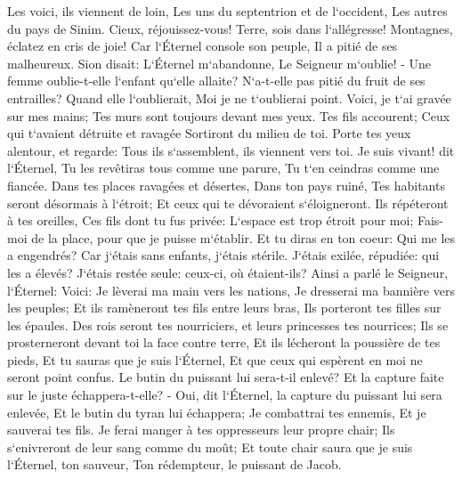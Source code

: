 \verse Les voici, ils viennent de loin, Les uns du septentrion et de l`occident, Les autres du pays de Sinim. 
\verse Cieux, réjouissez-vous! Terre, sois dans l`allégresse! Montagnes, éclatez en cris de joie! Car l`Éternel console son peuple, Il a pitié de ses malheureux. 
\verse Sion disait: L`Éternel m`abandonne, Le Seigneur m`oublie! - 
\verse Une femme oublie-t-elle l`enfant qu`elle allaite? N`a-t-elle pas pitié du fruit de ses entrailles? Quand elle l`oublierait, Moi je ne t`oublierai point. 
\verse Voici, je t`ai gravée sur mes mains; Tes murs sont toujours devant mes yeux. 
\verse Tes fils accourent; Ceux qui t`avaient détruite et ravagée Sortiront du milieu de toi. 
\verse Porte tes yeux alentour, et regarde: Tous ils s`assemblent, ils viennent vers toi. Je suis vivant! dit l`Éternel, Tu les revêtiras tous comme une parure, Tu t`en ceindras comme une fiancée. 
\verse Dans tes places ravagées et désertes, Dans ton pays ruiné, Tes habitants seront désormais à l`étroit; Et ceux qui te dévoraient s`éloigneront. 
\verse Ils répéteront à tes oreilles, Ces fils dont tu fus privée: L`espace est trop étroit pour moi; Fais-moi de la place, pour que je puisse m`établir. 
\verse Et tu diras en ton coeur: Qui me les a engendrés? Car j`étais sans enfants, j`étais stérile. J`étais exilée, répudiée: qui les a élevés? J`étais restée seule: ceux-ci, où étaient-ils? 
\verse Ainsi a parlé le Seigneur, l`Éternel: Voici: Je lèverai ma main vers les nations, Je dresserai ma bannière vers les peuples; Et ils ramèneront tes fils entre leurs bras, Ils porteront tes filles sur les épaules. 
\verse Des rois seront tes nourriciers, et leurs princesses tes nourrices; Ils se prosterneront devant toi la face contre terre, Et ils lécheront la poussière de tes pieds, Et tu sauras que je suis l`Éternel, Et que ceux qui espèrent en moi ne seront point confus. 
\verse Le butin du puissant lui sera-t-il enlevé? Et la capture faite sur le juste échappera-t-elle? - 
\verse Oui, dit l`Éternel, la capture du puissant lui sera enlevée, Et le butin du tyran lui échappera; Je combattrai tes ennemis, Et je sauverai tes fils. 
\verse Je ferai manger à tes oppresseurs leur propre chair; Ils s`enivreront de leur sang comme du moût; Et toute chair saura que je suis l`Éternel, ton sauveur, Ton rédempteur, le puissant de Jacob. 

